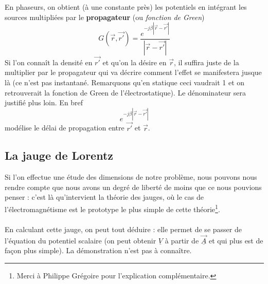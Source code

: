 	En phaseurs, on obtient (à une constante près) les potentiels en intégrant les sources 
	multipliées par le \textbf{propagateur} (ou \textit{fonction de Green})
	\begin{equation}
	G(\vec{r},\vec{r'}) = \dfrac{e^{-j\beta|\vec{r}-\vec{r'}|}}{|\vec{r}-\vec{r'}|}
	\end{equation}
	Si l'on connaît la densité en $\vec{r'}$ et qu'on la désire en $\vec{r}$, il suffira juste 
	de la multiplier par le propagateur qui va décrire comment l'effet se manifestera jusque là 
	(ce n'est pas instantané. Remarquons qu'en statique ceci vaudrait 1 et on retrouverait la 
	fonction de Green de l'électrostatique). Le dénominateur sera justifié plus loin. En bref
	\begin{equation}
	e^{-j\beta|\vec{r}-\vec{r'}|}
	\end{equation}
	modélise le délai de propagation entre $\vec{r'}$ et $\vec{r}$.\\
	
	
	\subsection{La jauge de Lorentz}
	Si l'on effectue une étude des dimensions de notre problème, nous pouvons nous rendre compte 
	que nous avons un degré de liberté de moins que ce nous pouvions penser : c'est là qu'intervient 
	la théorie des jauges, où le cas de l'électromagnétisme est le prototype le plus simple de 
	cette théorie\footnote{Merci à Philippe Grégoire pour l'explication complémentaire.}.\\
	\ \\
	
	En calculant cette jauge, on peut tout déduire : elle permet de se passer de l'équation du 
	potentiel scalaire (on peut obtenir $\underline{V}$ à partir de $\underline{\vec{A}}$ et 
	qui plus est de façon plus simple). La démonstration n'est pas à connaître.
	
